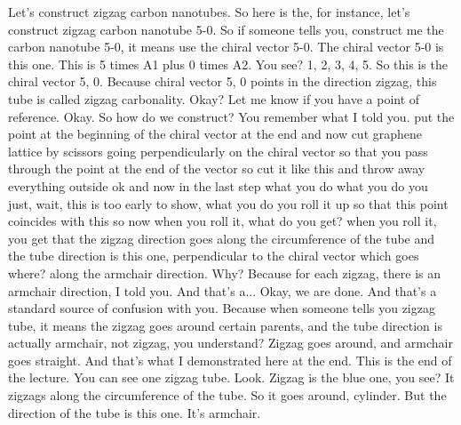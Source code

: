 Let's construct zigzag carbon nanotubes. So here is the, for instance, let's construct zigzag carbon nanotube 5-0. So if someone tells you, construct me the carbon nanotube 5-0, it means use the chiral vector 5-0. The chiral vector 5-0 is this one. This is 5 times A1 plus 0 times A2. You see? 1, 2, 3, 4, 5. So this is the chiral vector 5, 0. Because chiral vector 5, 0 points in the direction zigzag, this tube is called zigzag carbonality. Okay? Let me know if you have a point of reference. Okay. So how do we construct? You remember what I told you. put the point at the beginning of the chiral vector at the end and now cut graphene lattice by scissors going perpendicularly on the chiral vector so that you pass through the point at the end of the vector so cut it like this and throw away everything outside ok and now in the last step what you do what you do you just, wait, this is too early to show, what you do you roll it up so that this point coincides with this so now when you roll it, what do you get? when you roll it, you get that the zigzag direction goes along the circumference of the tube and the tube direction is this one, perpendicular to the chiral vector which goes where? along the armchair direction. Why? Because for each zigzag, there is an armchair direction, I told you. And that's a... Okay, we are done. And that's a standard source of confusion with you. Because when someone tells you zigzag tube, it means the zigzag goes around certain parents, and the tube direction is actually armchair, not zigzag, you understand? Zigzag goes around, and armchair goes straight. And that's what I demonstrated here at the end.
This is the end of the lecture. You can see one zigzag tube. Look. Zigzag is the blue one, you see? It zigzags along the circumference of the tube. So it goes around, cylinder. But the direction of the tube is this one. It's armchair.